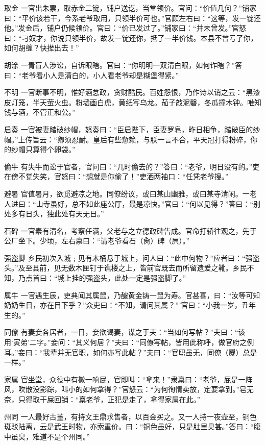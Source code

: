 \documentclass[12pt,UTF8]{ctexbook}
\begin{document}
取金
一官出朱票，取赤金二锭，铺户送讫，当堂领价。官问：“价值几何？”铺家曰：“平价该若干，今系老爷取用，只领半价可也。”官顾左右曰：“这等，发一锭还他。”发金后，铺户仍候领价。官曰：“价已发过了。”铺家曰：“并未曾发。”官怒曰：“刁奴才，你说只领半价，故发一锭还你，抵了一半价钱。本县不曾亏了你，如何胡缠？快撵出去！”

胡涂
一青盲人涉讼，自诉眼瞎。官曰：“你明明一双清白眼，如何诈瞎？”答曰：“老爷看小人是清白的，小人看老爷却是糊堡得紧。”

不明
一官断事不明，惟好酒怠政，贪财酷民。百姓怨恨，乃作诗以诮之云：“黑漆皮灯笼，半天萤火虫。粉墙画白虎，黄纸写乌龙。茄子敲泥磬，冬瓜撞木钟。唯知钱与酒，不管正和公。”

启奏
一官被妻踏破纱帽，怒奏曰：“臣启陛下，臣妻罗皂，昨日相争，踏破臣的纱帽。”上传旨云：“卿须忍耐。皇后有些惫赖，与朕一言不合，平天冠打得粉碎，你的纱帽只算得个卵袋。”

偷牛
有失牛而讼于官者，官问曰：“几时偷去的？”答曰：“老爷，明日没有的。”吏在傍不觉失笑，官怒曰：“想就是你偷了！”吏洒两袖口：“任凭老爷搜。”

避暑
官值暑月，欲觅避凉之地。同僚纷议，或曰某山幽雅，或曰某寺清闲。一老人进曰：“山寺虽好，总不如此座公厅，最是凉快。”官曰：“何以见得？”答曰：“别处多有日头，独此处有天无日。”

石碑
一官素有清名，考察任满，父老与之立德政碑告成。官命打轿往观之，先于公厂坐下。少顷，左右禀曰：“请老爷看石（肏）碑（屄）。”

强盗脚
乡民初次入城﹔见有木桶悬于城上，问人曰：“此中何物？”应者曰：“强盗头。”及至县前，见无数木匣钉于谯楼之上，皆前官既去而所留遗爱之靴。乡民不知，乃点首曰：“城上挂的强盗头，此处一定是强盗脚了。”

属牛
一官遇生辰，吏典闻其属鼠，乃醵黄金铸一鼠为寿。官甚喜，曰：“汝等可知奶奶生日，亦在目下乎？”众吏曰：“不知，请问其属？”’官曰：“小我一岁，丑年生的。”

同僚
有妻妾各居者，一日，妾欲谒妻，谋之于夫：“当如何写帖？”夫曰：“该用‘寅弟’二字。”妾问：“其义何居？”夫曰：“同僚写帖，皆用此称呼，做官府之例耳。”妾曰：“我辈并无官职，如何亦写此帖？”夫曰：“官职虽无，同僚（屪）总是一样。”

家属
官坐堂，众役中有撒一响屁，官即叫：“拿来！”隶禀曰：“老爷，屁是一阵风，吹散没影踪，叫小的如何拿得？”官怒云：“为何徇情卖放，定要拿到。”皂无奈，只得取干屎回销：“禀老爷，正犯是走了，拿得家属在此。”

州同
一人最好古董，有持文王鼎求售者，以百金买之。又一人持一夜壶至，铜色斑驳陆离，云是武王时物，亦索重价。曰：“铜色虽好，只是肚里臭甚。”答曰：“腹中虽臭，难道不是个州同。”
\end{document}
